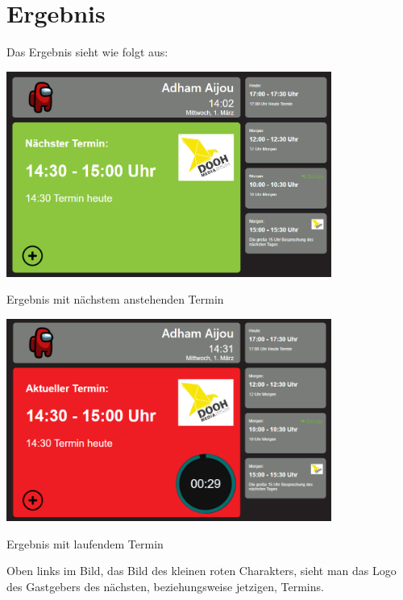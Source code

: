 
\newpage
\section{Ergebnis}\label{sec:ergebnis}
Das Ergebnis sieht wie folgt aus:
\par\vspace{1cm}
    \centering
    \includegraphics[width=0.8\textwidth]{Bilder/Ergebnis}
    \caption{Ergebnis mit nächstem anstehenden Termin}
    \label{fig:Ergebnis mit nächstem anstehenden Termin}
\par\vspace{1cm}
\raggedright
\par\vspace{1cm}
    \centering
    \includegraphics[width=0.8\textwidth]{Bilder/Ergebnis_LaufenderTermin.png}
    \caption{Ergebnis mit laufendem Termin}
    \label{fig:Ergebnis mit laufendem Termin}
\par\vspace{1cm}
\raggedright
\newline
Oben links im Bild, das Bild des kleinen roten Charakters, sieht man das Logo des Gastgebers des nächsten, beziehungsweise jetzigen, Termins.
